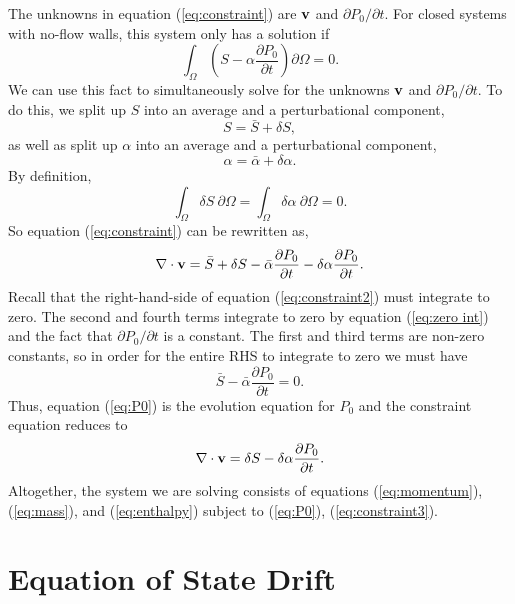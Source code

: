\documentclass[final]{siamltex}
\def\vb {{\bf v}}
\begin{document}
The unknowns in equation (\ref{eq:constraint}) are $\vb$ and $\partial P_0/\partial t$.
For closed systems with no-flow walls, this system only has a solution if
\begin{equation}
\int_{\Omega} \left(S - \alpha\frac{\partial P_0}{\partial t}\right)\partial\Omega = 0.
\end{equation}
We can use this fact to simultaneously solve for the unknowns
$\vb$ and $\partial P_0/\partial t$.
To do this, we split up $S$ into an average and a perturbational component,
\begin{equation}
S = \bar{S} + \delta S,
\end{equation}
as well as split up $\alpha$ into an average and a perturbational component,
\begin{equation}
\alpha = \bar{\alpha} + \delta\alpha.
\end{equation}
By definition,
\begin{equation}
\int_{\Omega} \delta S ~\partial\Omega = \int_{\Omega} \delta \alpha ~\partial\Omega = 0.\label{eq:zero int}
\end{equation}
So equation (\ref{eq:constraint}) can be rewritten as,
\begin{equation}
\nabla\cdot\vb = \bar{S} + \delta S - \bar{\alpha}\frac{\partial P_0}{\partial t} - \delta\alpha\frac{\partial P_0}{\partial t}.\label{eq:constraint2}
\end{equation}
Recall that the right-hand-side of equation (\ref{eq:constraint2}) must integrate to zero.
The second and fourth terms integrate to zero by equation (\ref{eq:zero int}) and the fact that
$\partial P_0/\partial t$ is a constant.
The first and third terms are non-zero constants,
so in order for the entire RHS to integrate to zero we must have
\begin{equation}
\bar{S} - \bar{\alpha}\frac{\partial P_0}{\partial t} = 0.\label{eq:P0}
\end{equation}
Thus, equation (\ref{eq:P0}) is the evolution equation for $P_0$ and the constraint equation reduces to
\begin{equation}
\nabla\cdot\vb = \delta S - \delta\alpha\frac{\partial P_0}{\partial t}.\label{eq:constraint3}
\end{equation}
Altogether, the system we are solving consists of equations (\ref{eq:momentum}),  (\ref{eq:mass}), and (\ref{eq:enthalpy})
subject to (\ref{eq:P0}), (\ref{eq:constraint3}).

\section{Equation of State Drift}
\end{document}

